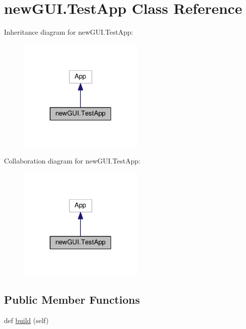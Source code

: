 \hypertarget{classnewGUI_1_1TestApp}{}\section{new\+G\+U\+I.\+Test\+App Class Reference}
\label{classnewGUI_1_1TestApp}


Inheritance diagram for new\+G\+U\+I.\+Test\+App\+:
\nopagebreak
\begin{figure}[H]
\begin{center}
\leavevmode
\includegraphics[width=172pt]{classnewGUI_1_1TestApp__inherit__graph}
\end{center}
\end{figure}


Collaboration diagram for new\+G\+U\+I.\+Test\+App\+:
\nopagebreak
\begin{figure}[H]
\begin{center}
\leavevmode
\includegraphics[width=172pt]{classnewGUI_1_1TestApp__coll__graph}
\end{center}
\end{figure}
\subsection*{Public Member Functions}
\begin{DoxyCompactItemize}
\item 
def \hyperlink{classnewGUI_1_1TestApp_a4d94c14d0aaeaa5ef1a931bd44fd9800}{build} (self)
\end{DoxyCompactItemize}
